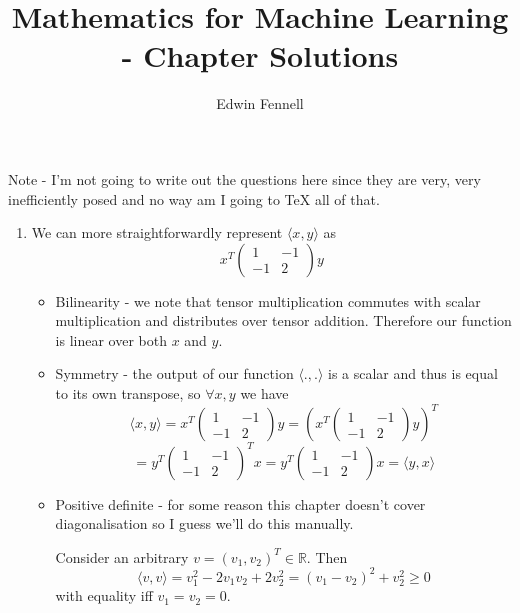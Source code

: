 \documentclass{article}
\title{Mathematics for Machine Learning - Chapter \chapternumber\space Solutions}
\author{Edwin Fennell}
\date{}
\newcommand{\chapternumber}{3}
\newenvironment{QandA}{\begin{enumerate}[label=\chapternumber.\arabic*]\bfseries\boldmath}
	{\end{enumerate}}
\newenvironment{answered}{\par\bigskip\normalfont\unboldmath}{}
\begin{document}
	\maketitle
	
	Note - I'm not going to write out the questions here since they are very, very inefficiently posed and no way am I going to TeX all of that.
	
		
	\noindent%
	\begin{QandA}
		\item 
		\begin{answered}
			We can more straightforwardly represent $\langle x,y\rangle$ as 
			\[x^T
			\begin{pmatrix}
				1 & -1 \\
				-1 & 2
			\end{pmatrix}
			y\]
			\begin{itemize}
				\item Bilinearity - we note that tensor multiplication commutes with scalar multiplication and distributes over tensor addition. Therefore our function is linear over both $x$ and $y$.
				\item Symmetry - the output of our function $\langle .,.\rangle$ is a scalar and thus is equal to its own transpose, so $\forall x,y$ we have
				\[
				\langle x,y\rangle
				=
				x^T
				\begin{pmatrix}
					1 & -1 \\
					-1 & 2
				\end{pmatrix}
				y
				=
				\left(
				x^T
				\begin{pmatrix}
					1 & -1 \\
					-1 & 2
				\end{pmatrix}
				y
				\right)^T
				\]
				\[
				=
				y^T
				\begin{pmatrix}
					1 & -1 \\
					-1 & 2
				\end{pmatrix}^T
				x
				=
								y^T
				\begin{pmatrix}
					1 & -1 \\
					-1 & 2
				\end{pmatrix}
				x
				=
				\langle y,x\rangle
				\]
				\item Positive definite - for some reason this chapter doesn't cover diagonalisation so I guess we'll do this manually. 
				
				Consider an arbitrary $v = (v_1,v_2)^T\in\mathbb{R}$. Then
				\[\langle v,v \rangle = 
				v_1^2-2v_1v_2+2v_2^2 = (v_1-v_2)^2 + v_2^2\geq0								
				\]
				with equality iff $v_1=v_2=0$.
			\end{itemize}
		\end{answered}
		

\end{QandA}
\end{document}
